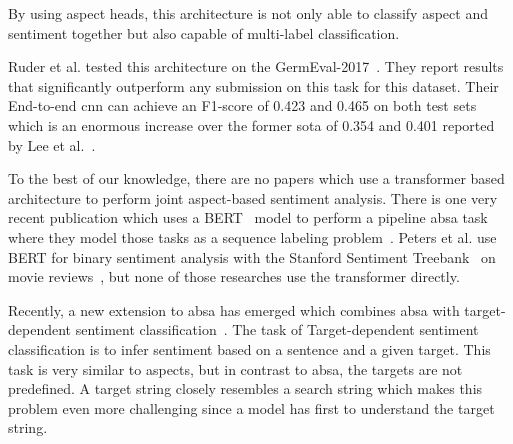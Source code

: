 By using aspect heads, this architecture is not only able to classify aspect and sentiment together but also capable of multi-label classification.

Ruder et al. tested this architecture on the GermEval-2017~\cite{Wojatzki2017}. They report results that significantly outperform any submission on this task for this dataset. Their End-to-end \gls{cnn} can achieve an F1-score of 0.423 and 0.465 on both test sets which is an enormous increase over the former \acrfull{sota} of 0.354 and 0.401 reported by Lee et al.~\cite{Lee2017}.
\medskip

To the best of our knowledge, there are no papers which use a transformer based architecture to perform joint aspect-based sentiment analysis. There is one very recent publication which uses a BERT~\cite{Devlin2018} model to perform a pipeline \gls{absa} task where they model those tasks as a sequence labeling problem~\cite{Xu2019}. Peters et al. use BERT for binary sentiment analysis with the Stanford Sentiment Treebank~\cite{Socher2013} on movie reviews~\cite{Peters2019}, but none of those researches use the transformer directly.
\medskip

Recently, a new extension to \gls{absa} has emerged which combines \gls{absa} with target-dependent sentiment classification~\cite{Tang2016}. The task of Target-dependent sentiment classification is to infer sentiment based on a sentence and a given target. This task is very similar to aspects, but in contrast to \gls{absa}, the targets are not predefined. A target string closely resembles a search string which makes this problem even more challenging since a model has first to understand the target string.